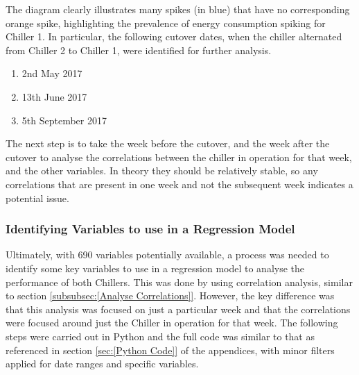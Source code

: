 \documentclass[12pt]{scrartcl}
\begin{document}
The diagram clearly illustrates many spikes (in blue) that have no corresponding orange spike, highlighting the prevalence of energy consumption spiking for Chiller 1. In particular, the following cutover dates, when the chiller alternated from Chiller 2 to Chiller 1, were identified for further analysis. 
\begin{enumerate}
  \item 2nd May 2017
   \item 13th June 2017
  \item 5th September 2017 
\end{enumerate}

The next step is to take the week before the cutover, and the week after the cutover to analyse the correlations between the chiller in operation for that week, and the other variables. In theory they should be relatively stable, so any correlations that are present in one week and not the subsequent week indicates a potential issue. 

\subsubsection{Identifying Variables to use in a Regression Model}
\label{subsubsec:[Identifying Variables to use in a Regression Model]}

Ultimately, with 690 variables potentially available, a process was needed to identify some key variables to use in a regression model to analyse the performance of both Chillers. This was done by using correlation analysis, similar to section \ref{subsubsec:[Analyse Correlations]}. However, the key difference was that this analysis was focused on just a particular week and that the correlations were focused around just the Chiller in operation for that week. The following steps were carried out in Python and the full code was similar to that as referenced in section \ref{sec:[Python Code]} of the appendices, with minor filters applied for date ranges and specific variables.
\end{document}
